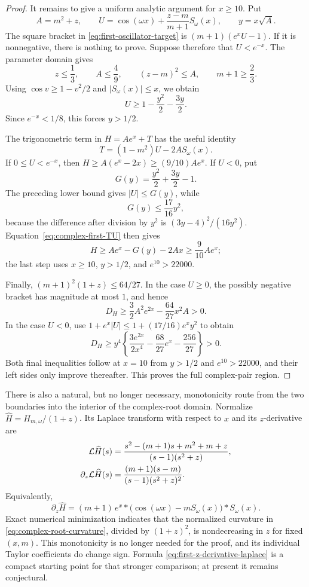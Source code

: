 \documentclass[11pt]{article}
\theoremstyle{remark}
\begin{document}
\begin{proof}
It remains to give a uniform analytic argument for $x\geq10$.  Put
\[
 A=m^2+z,\qquad
 U=\cos(\omega x)+\frac{z-m}{m+1}S_\omega(x),\qquad y=x\sqrt A.
\]
The square bracket in \eqref{eq:first-oscillator-target} is
$(m+1)(e^xU-1)$.  If it is nonnegative, there is nothing to prove.  Suppose
therefore that $U<e^{-x}$.  The parameter domain gives
\[
 z\leq\frac13,\qquad A\leq\frac49,\qquad
 (z-m)^2\leq A,\qquad m+1\geq\frac23.
\]
Using $\cos v\geq1-v^2/2$ and $|S_\omega(x)|\leq x$, we obtain
\[
 U\geq1-\frac{y^2}{2}-\frac{3y}{2}.
\]
Since $e^{-x}<1/8$, this forces $y>1/2$.

The trigonometric term in $H=Ae^x+T$ has the useful identity
\begin{equation}\label{eq:complex-first-TU}
 T=(1-m^2)U-2A S_\omega(x).
\end{equation}
If $0\leq U<e^{-x}$, then
$H\geq A(e^x-2x)\geq(9/10)Ae^x$.  If $U<0$, put
\[
 G(y)=\frac{y^2}{2}+\frac{3y}{2}-1.
\]
The preceding lower bound gives $|U|\leq G(y)$, while
\[
 G(y)\leq\frac{17}{16}y^2,
\]
because the difference after division by $y^2$ is
$(3y-4)^2/(16y^2)$.  Equation~\eqref{eq:complex-first-TU} then gives
\[
 H\geq Ae^x-G(y)-2Ax\geq\frac9{10}Ae^x;
\]
the last step uses $x\geq10$, $y>1/2$, and $e^{10}>22000$.

Finally,
$(m+1)^2(1+z)\leq64/27$.  In the case $U\geq0$, the possibly negative
bracket has magnitude at most $1$, and hence
\[
 D_H\geq\frac32A^2e^{2x}-\frac{64}{27}x^2A>0.
\]
In the case $U<0$, use
$1+e^x|U|\leq1+(17/16)e^xy^2$ to obtain
\[
 D_H\geq y^4\left\{
 \frac{3e^{2x}}{2x^4}-\frac{68}{27}e^x-\frac{256}{27}
 \right\}>0.
\]
Both final inequalities follow at $x=10$ from $y>1/2$ and
$e^{10}>22000$, and their left sides only improve thereafter.  This proves
the full complex-pair region.
\end{proof}

There is also a natural, but no longer necessary, monotonicity route from the
two boundaries into the interior of the
complex-root domain.  Normalize
$\widehat H=H_{m,\omega}/(1+z)$.  Its Laplace transform with respect to $x$
and its $z$-derivative are
\begin{align}
 \mathcal L\widehat H(s)
 &=\frac{s^2-(m+1)s+m^2+m+z}{(s-1)(s^2+z)},\notag\\
 \partial_z\mathcal L\widehat H(s)
 &=\frac{(m+1)(s-m)}{(s-1)(s^2+z)^2}.
 \label{eq:first-z-derivative-laplace}
\end{align}
Equivalently,
\[
 \partial_z\widehat H
 =(m+1)\,e^x*
 \bigl(\cos(\omega x)-mS_\omega(x)\bigr)*S_\omega(x).
\]
Exact numerical minimization indicates that the normalized curvature in
\eqref{eq:complex-root-curvature}, divided by $(1+z)^2$, is nondecreasing in
$z$ for fixed $(x,m)$.  This monotonicity is no longer needed for the proof,
and its individual Taylor coefficients do change sign.  Formula
\eqref{eq:first-z-derivative-laplace} is a compact starting point for that
stronger comparison; at present it remains conjectural.
\end{document}
